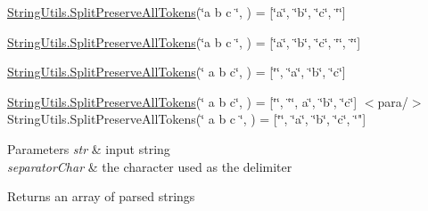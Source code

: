 \hyperlink{class_ultimate_1_1_utilities_1_1_string_utils_a64a975f2729d81bf8a31b1138db0443e}{String\+Utils.\+Split\+Preserve\+All\+Tokens}(\char`\"{}a b c \char`\"{}, \textquotesingle{} \textquotesingle{}) = \mbox{[}\char`\"{}a\char`\"{}, \char`\"{}b\char`\"{}, \char`\"{}c\char`\"{}, \char`\"{}\char`\"{}\mbox{]} 

\hyperlink{class_ultimate_1_1_utilities_1_1_string_utils_a64a975f2729d81bf8a31b1138db0443e}{String\+Utils.\+Split\+Preserve\+All\+Tokens}(\char`\"{}a b c  \char`\"{}, \textquotesingle{} \textquotesingle{}) = \mbox{[}\char`\"{}a\char`\"{}, \char`\"{}b\char`\"{}, \char`\"{}c\char`\"{}, \char`\"{}\char`\"{}, \char`\"{}\char`\"{}\mbox{]} 

\hyperlink{class_ultimate_1_1_utilities_1_1_string_utils_a64a975f2729d81bf8a31b1138db0443e}{String\+Utils.\+Split\+Preserve\+All\+Tokens}(\char`\"{} a b c\char`\"{}, \textquotesingle{} \textquotesingle{}) = \mbox{[}\char`\"{}\char`\"{}, \char`\"{}a\char`\"{}, \char`\"{}b\char`\"{}, \char`\"{}c\char`\"{}\mbox{]} 

\hyperlink{class_ultimate_1_1_utilities_1_1_string_utils_a64a975f2729d81bf8a31b1138db0443e}{String\+Utils.\+Split\+Preserve\+All\+Tokens}(\char`\"{}  a b c\char`\"{}, \textquotesingle{} \textquotesingle{}) = \mbox{[}\char`\"{}\char`\"{}, \char`\"{}\char`\"{}, a\char`\"{}, \char`\"{}b\char`\"{}, \char`\"{}c\char`\"{}\mbox{]}
$<$para/$>$ String\+Utils.\+Split\+Preserve\+All\+Tokens(\char`\"{} a b c \char`\"{}, \textquotesingle{} \textquotesingle{})  = \mbox{[}\char`\"{}\char`\"{}, \char`\"{}a\char`\"{}, \char`\"{}b\char`\"{}, \char`\"{}c\char`\"{}, \char`\"{}"\mbox{]} 


\begin{DoxyParams}{Parameters}
{\em str} & input string\\
\hline
{\em separator\+Char} & the character used as the delimiter\\
\hline
\end{DoxyParams}
\begin{DoxyReturn}{Returns}
an array of parsed strings
\end{DoxyReturn}
